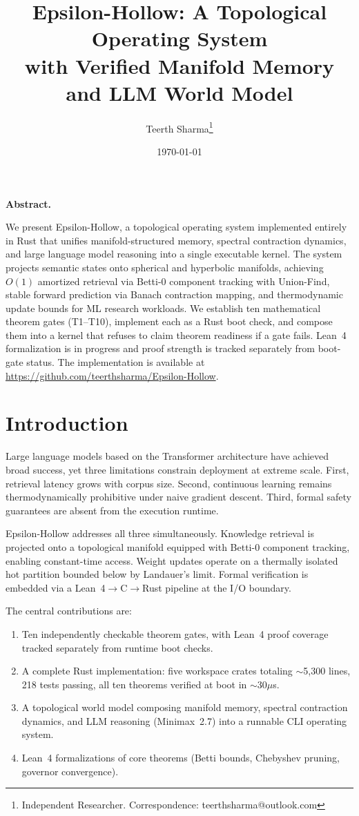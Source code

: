 \documentclass[11pt, a4paper]{article}
\title{Epsilon-Hollow: A Topological Operating System\\with Verified Manifold Memory and LLM World Model}
\author{Teerth Sharma\thanks{Independent Researcher. Correspondence: teerthsharma@outlook.com}}
\date{\today}
\renewenvironment{abstract}{%
  \textbf{Abstract.}%
  \ignorespaces%
}{\par\vspace{0.5em}}
\theoremstyle{proofform}
\numberwithin{innerpoints}{subsection}
\numberwithin{disproof}{subsection}
\theoremstyle{mathproof}
\begin{document}
\maketitle
\begin{abstract}
We present Epsilon-Hollow, a topological operating system implemented entirely in Rust that unifies manifold-structured memory, spectral contraction dynamics, and large language model reasoning into a single executable kernel. The system projects semantic states onto spherical and hyperbolic manifolds, achieving $O(1)$ amortized retrieval via Betti-0 component tracking with Union-Find, stable forward prediction via Banach contraction mapping, and thermodynamic update bounds for ML research workloads. We establish ten mathematical theorem gates (T1--T10), implement each as a Rust boot check, and compose them into a kernel that refuses to claim theorem readiness if a gate fails. Lean~4 formalization is in progress and proof strength is tracked separately from boot-gate status. The implementation is available at \url{https://github.com/teerthsharma/Epsilon-Hollow}.
\end{abstract}

\linenumbers

\section{Introduction}
\label{sec:introduction}

Large language models based on the Transformer architecture have achieved broad success, yet three limitations constrain deployment at extreme scale. First, retrieval latency grows with corpus size. Second, continuous learning remains thermodynamically prohibitive under naive gradient descent. Third, formal safety guarantees are absent from the execution runtime.

Epsilon-Hollow addresses all three simultaneously. Knowledge retrieval is projected onto a topological manifold equipped with Betti-0 component tracking, enabling constant-time access. Weight updates operate on a thermally isolated hot partition bounded below by Landauer's limit. Formal verification is embedded via a Lean~4$\to$C$\to$Rust pipeline at the I/O boundary.

The central contributions are:
\begin{enumerate}[nosep]
  \item Ten independently checkable theorem gates, with Lean~4 proof coverage tracked separately from runtime boot checks.
  \item A complete Rust implementation: five workspace crates totaling $\sim$5{,}300 lines, 218 tests passing, all ten theorems verified at boot in $\sim$30$\mu$s.
  \item A topological world model composing manifold memory, spectral contraction dynamics, and LLM reasoning (Minimax~2.7) into a runnable CLI operating system.
  \item Lean~4 formalizations of core theorems (Betti bounds, Chebyshev pruning, governor convergence).
\end{enumerate}
\end{document}
